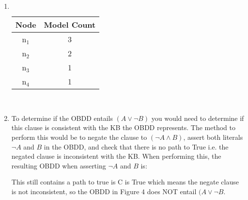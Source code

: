 \documentclass{article}
\begin{document}
\section{}
\begin{enumerate}
    \item \[\]
    \begin{center}
           \begin{tabular}{ |c|c| }
                \hline
                 Node&Model Count \\ 
                 \hline
                n$_1$&3 \\
                n$_2$&2 \\
                n$_3$&1 \\
                n$_4$&1 \\
                 \hline
                \end{tabular} \\
    \end{center}
    \item To determine if the OBDD entails $(A \lor \lnot B)$ you would need to determine if this clause is consistent with the KB the OBDD represents.  The method to perform this would be to negate the clause to $(\lnot A \land B)$, assert both literals $\lnot A$ and $B$ in the OBDD, and check that there is no path to True i.e. the negated clause is inconsistent with the KB.  When performing this, the resulting OBDD when asserting $\lnot A$ and $B$ is:
    \begin{center}
    \end{center}
    This still contains a path to true is C is True which means the negate clause is not inconsistent, so the OBDD in Figure 4 does NOT entail $(A \lor \lnot B$.
\end{enumerate}

\clearpage
\section{}

\clearpage
\section{}
\end{document}
